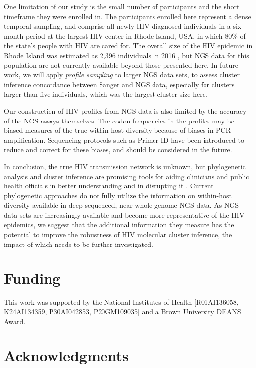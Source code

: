 \documentclass[letterpaper]{article}
\begin{document}
One limitation of our study is the small number of participants and the short timeframe they were enrolled in. The participants enrolled here represent a dense temporal sampling, and comprise all newly HIV-diagnosed individuals in a six month period at the largest HIV center in Rhode Island, USA, in which 80\% of the state's people with HIV are cared for. The overall size of the HIV epidemic in Rhode Island was estimated as 2,396 individuals in 2016 \parencite{ridoh}, but NGS data for this population are not currently available beyond those presented here. In future work, we will apply \emph{profile sampling} to larger NGS data sets, to assess cluster inference concordance between Sanger and NGS data, especially for clusters larger than five individuals, which was the largest cluster size here.

Our construction of HIV profiles from NGS data is also limited by the accuracy of the NGS assays themselves. The codon frequencies in the profiles may be biased measures of the true within-host diversity because of biases in PCR amplification. Sequencing protocols such as Primer ID \parencite{jabara} have been introduced to reduce and correct for these biases, and should be considered in the future.

In conclusion, the true HIV transmission network is unknown, but phylogenetic analysis and cluster inference are promising tools for aiding clinicians and public health officials in better understanding and in disrupting it \parencite{fauci}. Current phylogenetic approaches do not fully utilize the information on within-host diversity available in deep-sequenced, near-whole genome NGS data. As NGS data sets are increasingly available and become more representative of the HIV epidemics, we suggest that the additional information they measure has the potential to improve the robustness of HIV molecular cluster inference, the impact of which needs to be further investigated.

\section*{Funding}

This work was supported by the National Institutes of Health [R01AI136058, K24AI134359, P30AI042853, P20GM109035] and a Brown University DEANS Award.

\section*{Acknowledgments}
\end{document}
